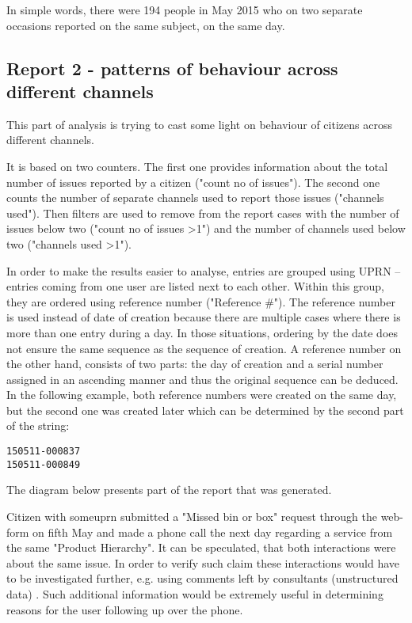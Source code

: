 In simple words, there were 194 people in May 2015 who on two separate occasions reported on the same subject, on the same day.
			
		\subsection{Report 2 - patterns of behaviour across different channels}
		
This part of analysis is trying to cast some light on behaviour of citizens across different channels.

It is based on two counters. The first one provides information about the total number of issues reported by a citizen ("count no of issues"). The second one counts the number of separate channels used to report those issues ("channels used"). Then filters are used to remove from the report cases with the number of issues below two ("count no of issues \textgreater 1") and the number of channels used below two ("channels used \textgreater 1").

In order to make the results easier to analyse, entries are grouped using UPRN – entries coming from one user are listed next to each other. Within this group, they are ordered using reference number ("Reference \#"). The reference number is used instead of date of creation because there are multiple cases where there is more than one entry during a day. In those situations, ordering by the date does not ensure the same sequence as the sequence of creation. A reference number on the other hand, consists of two parts: the day of creation and a serial number assigned in an ascending manner and thus the original sequence can be deduced. In the following example, both reference numbers were created on the same day, but the second one was created later which can be determined by the second part of the string:
\begin{lstlisting}
150511-000837
150511-000849
\end{lstlisting}

The diagram below presents part of the report that was generated.

Citizen with some\textunderscore uprn submitted a "Missed bin or box" request through the web-form on fifth May and made a phone call the next day regarding a service from the same "Product Hierarchy". It can be speculated, that both interactions were about the same issue. In order to verify such claim these interactions would have to be investigated further, e.g. using comments left by consultants (unstructured data) \citep{baars2008management}. Such additional information would be extremely useful in determining reasons for the user following up over the phone.

